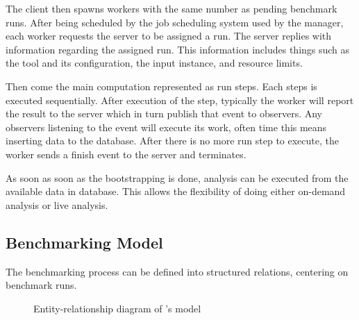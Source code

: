 The client then spawns workers with the same number as pending benchmark runs.
After being scheduled by the job scheduling system used by the manager, each worker requests the server to be assigned a run.
The server replies with information regarding the assigned run.
This information includes things such as the tool and its configuration, the input instance, and resource limits.

Then come the main computation represented as run steps.
Each steps is executed sequentially.
After execution of the step, typically the worker will report the result to the server which in turn publish that event to observers.
Any observers listening to the event will execute its work, often time this means inserting data to the database.
After there is no more run step to execute, the worker sends a finish event to the server and terminates.

As soon as soon as the bootstrapping is done, analysis can be executed from the available data in database.
This allows the flexibility of doing either on-demand analysis or live analysis.


\subsection{Benchmarking Model}

The benchmarking process can be defined into structured relations, centering on benchmark runs.

\begin{figure}
    \centering
    \caption{Entity-relationship diagram of \OurBenchmarkingTool's model}
    \label{fig:erd}
\end{figure}

